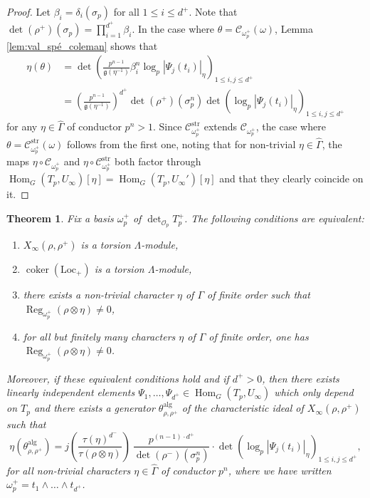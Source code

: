 \documentclass[12pt]{amsart}
\newcommand\cO{\mathcal{O}}
\newcommand\g{\mathfrak{g}}
\newcommand\sC{\mathscr{C}}
\newcommand{\Loc}{\mathrm{Loc}}
\newcommand{\str}{\mathrm{str}}
\newcommand{\alg}{\textrm{alg}}
\DeclareMathOperator{\Hom}{Hom}
\DeclareMathOperator{\coker}{coker}
\DeclareMathOperator{\Reg}{Reg}
\theoremstyle{defstyle}
\theoremstyle{thmstyle}
\newtheorem{theorem}[subsubsection]{Theorem}
\begin{document}
\begin{proof}
	Let $\beta_i=\delta_i(\sigma_p)$ for all $1\leq i \leq d^+$. Note that $\det(\rho^+)(\sigma_p)=\prod_{i=1}^{d^+}\beta_i$. In the case where $\theta=\sC_{\omega_p^+}(\omega)$, Lemma \ref{lem:val_spé_coleman} shows that
	\begin{align*}
	\eta(\theta) &= \det\left(\frac{p^{n-1}}{\g(\eta^{-1})} \beta_i^n\log_p|{\Psi}_j(t_i)|_\eta\right)_{1\leq i,j \leq d^+} \\
	&=\left(\frac{p^{n-1}}{\g(\eta^{-1})}\right)^{d^+}\det(\rho^+)(\sigma_p^n)\det \left(\log_p|{\Psi}_j(t_i)|_\eta\right)_{1\leq i,j \leq d^+}
	\end{align*}
	for any $\eta\in\widehat{\Gamma}$ of conductor $p^n>1$. Since $\sC^\str_{\omega_p^+}$ extends $\sC_{\omega_p^+}$, the case where $\theta=\sC^\str_{\omega_p^+}(\omega)$ follows from the first one, noting that for non-trivial $\eta\in\widehat{\Gamma}$, the maps $\eta \circ \sC_{\omega_p^+}$ and $\eta \circ \sC^\str_{\omega_p^+}$ both factor through $\Hom_G(T_p,U_\infty)[\eta]=\Hom_G(T_p,U_\infty')[\eta]$ and that they clearly coincide on it.
\end{proof}
\begin{theorem}\label{thm:equivalence_torsionness_Sel}
	Fix a basis $\omega_p^+$ of $\det_{\cO_p}T_p^+$. The following conditions are equivalent:
	\begin{enumerate}
		\item[(i)] $X_\infty(\rho,\rho^+)$ is a torsion $\Lambda$-module,
		\item[(ii)] $\coker\left(\Loc_+\right)$ is a torsion $\Lambda$-module,
		\item[(iii)] there exists a non-trivial character $\eta$ of ${\Gamma}$ of finite order such that $\Reg_{\omega_p^+}(\rho \otimes \eta)\neq 0$,
		\item[(iv)] for all but finitely many characters $\eta$ of $\Gamma$ of finite order, one has $\Reg_{\omega_p^+}(\rho \otimes \eta)\neq 0$.
	\end{enumerate}
Moreover, if these equivalent conditions hold and if $d^+>0$, then there exists linearly independent elements $\Psi_1,\ldots,\Psi_{d^+}\in\Hom_G(T_p,U_\infty)$ which only depend on $T_p$ and there exists a generator $\theta^\alg_{\rho,\rho^+}$ of the characteristic ideal of $X_\infty(\rho,\rho^+)$ such that 
\begin{equation}\label{eq:interpolation_algebraic_p_adic_L_function}
\eta(\theta^\alg_{\rho,\rho^+}) = j\left(\frac{\tau(\eta)^{d^-}}{\tau(\rho\otimes\eta)}\right)\ \frac{p^{(n-1)\cdot d^+}}{\det(\rho^-)(\sigma_p^n)} \cdot\det \left(\log_p|\Psi_j(t_i)|_\eta\right)_{1\leq i,j \leq d^+}, 
\end{equation}
for all non-trivial characters $\eta\in\widehat{\Gamma}$ of conductor $p^n$, where we have written $\omega_p^+=t_1\wedge\ldots\wedge t_{d^+}$.
\end{theorem}
\end{document}
